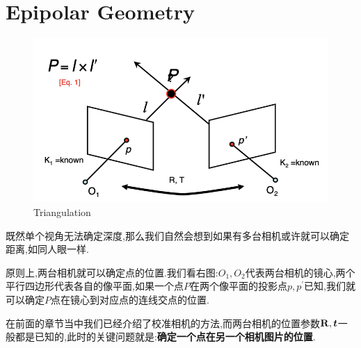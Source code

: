 \section{Epipolar Geometry}
\begin{figure}
	\includegraphics[scale=0.3]{figures/triangulation.png}
	\caption{Triangulation}
\end{figure}

既然单个视角无法确定深度,那么我们自然会想到如果有多台相机或许就可以确定距离,如同人眼一样.

原则上,两台相机就可以确定点的位置.我们看右图:$O_1, O_2$代表两台相机的镜心,两个平行四边形代表各自的像平面,如果一个点$P$在两个像平面的投影点$p, p^\prime$已知,我们就可以确定$P$点在镜心到对应点的连线交点的位置.

在前面的章节当中我们已经介绍了校准相机的方法,而两台相机的位置参数$\bold{R}, \boldsymbol t$一般都是已知的,此时的关键问题就是:\textbf{确定一个点在另一个相机图片的位置}.



